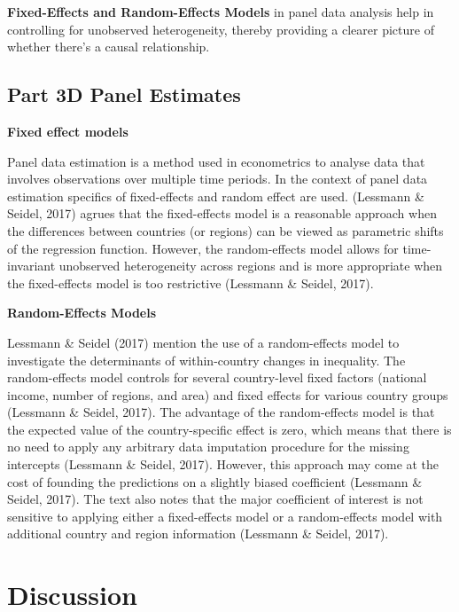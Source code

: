 \documentclass[
  a4paper,
  DIV=11,
  numbers=noendperiod]{scrartcl}
\begin{document}
\textbf{Fixed-Effects and Random-Effects Models} in panel data analysis
help in controlling for unobserved heterogeneity, thereby providing a
clearer picture of whether there's a causal relationship.

\hypertarget{part-3d-panel-estimates}{%
\subsection{Part 3D Panel Estimates}\label{part-3d-panel-estimates}}

\textbf{Fixed effect models}

Panel data estimation is a method used in econometrics to analyse data
that involves observations over multiple time periods. In the context of
panel data estimation specifics of fixed-effects and random effect are
used. (Lessmann \& Seidel, 2017) agrues that the fixed-effects model is
a reasonable approach when the differences between countries (or
regions) can be viewed as parametric shifts of the regression function.
However, the random-effects model allows for time-invariant unobserved
heterogeneity across regions and is more appropriate when the
fixed-effects model is too restrictive (Lessmann \& Seidel, 2017).

\textbf{Random-Effects Models}

Lessmann \& Seidel (2017) mention the use of a random-effects model to
investigate the determinants of within-country changes in inequality.
The random-effects model controls for several country-level fixed
factors (national income, number of regions, and area) and fixed effects
for various country groups (Lessmann \& Seidel, 2017). The advantage of
the random-effects model is that the expected value of the
country-specific effect is zero, which means that there is no need to
apply any arbitrary data imputation procedure for the missing intercepts
(Lessmann \& Seidel, 2017). However, this approach may come at the cost
of founding the predictions on a slightly biased coefficient (Lessmann
\& Seidel, 2017). The text also notes that the major coefficient of
interest is not sensitive to applying either a fixed-effects model or a
random-effects model with additional country and region information
(Lessmann \& Seidel, 2017).

\hypertarget{discussion}{%
\section{Discussion}\label{discussion}}
\end{document}
